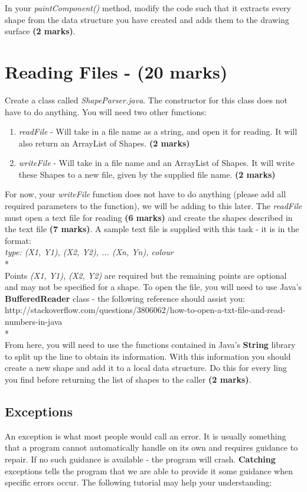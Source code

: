 \documentclass[a4paper,12pt]{article}
\begin{document}
In your \textit{paintComponent()} method, modify the code such that it extracts every shape from the data structure you have created and adds them to the drawing surface {\bf (2 marks)}.

\newpage
\section{Reading Files - (20 marks)}
Create a class called \textit{ShapeParser.java}. The constructor for this class does not have to do anything. You will need two other functions:
\begin{enumerate}
\item \textit{readFile} - Will take in a file name as a string, and open it for reading. It will also return an ArrayList of Shapes. {\bf (2 marks)}
\item \textit{writeFile} - Will take in a file name and an ArrayList of Shapes. It will write these Shapes to a new file, given by the supplied file name. {\bf (2 marks)}
\end{enumerate}
For now, your \textit{writeFile} function does not have to do anything (please add all required parameters to the function), we will be adding to this later. The \textit{readFile} must open a text file for reading {\bf (6 marks)} and create the shapes described in the text file {\bf (7 marks)}. A sample text file is supplied with this task - it is in the format:\\

\textit{type: (X1, Y1), (X2, Y2), ... (Xn, Yn), colour}\\*
\\
Points \textit{(X1, Y1), (X2, Y2)} are required but the remaining points are optional and may not be specified for a shape. To open the file, you will need to use Java's {\bf BufferedReader} class - the following reference should assist you:\\

http://stackoverflow.com/questions/3806062/how-to-open-a-txt-file-and-read-numbers-in-java\\*
\\
From here, you will need to use the functions contained in Java's {\bf String} library to split up the line to obtain its information. With this information you should create a new shape and add it to a local data structure. Do this for every ling you find before returning the list of shapes to the caller {\bf (2 marks)}. 

\subsection*{Exceptions}
An exception is what most people would call an error. It is usually something that a program cannot automatically handle on its own and requires guidance to repair. If no such guidance is available - the program will crash. {\bf Catching} exceptions tells the program that we are able to provide it some guidance when  specific errors occur. The following tutorial may help your understanding:\\
\end{document}
